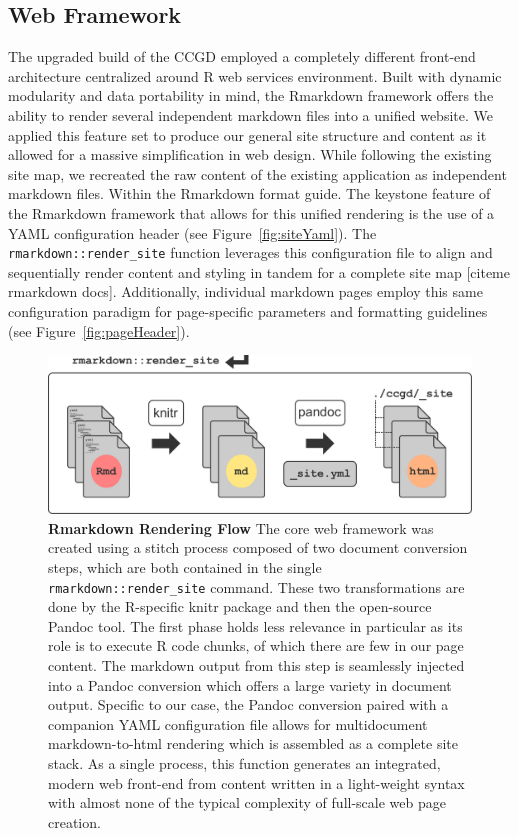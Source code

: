 \documentclass[10pt]{report}
\begin{document}
\subsection{Web Framework}
The upgraded build of the CCGD employed a completely different front-end architecture centralized around R web services environment. Built with dynamic modularity and data portability in mind, the Rmarkdown framework offers the ability to render several independent markdown files into a unified website. We applied this feature set to produce our general site structure and content as it allowed for a massive simplification in web design. While following the existing site map, we recreated the raw content of the existing application as independent markdown files. Within the Rmarkdown format guide. The keystone feature of the Rmarkdown framework that allows for this unified rendering is the use of a YAML configuration header (see Figure~\ref{fig:siteYaml}). The \texttt{rmarkdown::render\_site} function leverages this configuration file to align and sequentially render content and styling in tandem for a complete site map [citeme rmarkdown docs]. Additionally, individual markdown pages employ this same configuration paradigm for page-specific parameters and formatting guidelines (see Figure~\ref{fig:pageHeader}).

\begin{figure}[H]
    \includegraphics[width=\linewidth]{fig/rmarkdown_flow.pdf}
    \caption[Rmarkdown Rendering Flow]{\textbf{Rmarkdown Rendering Flow} The core web framework was created using a stitch process composed of two document conversion steps, which are both contained in the single \texttt{rmarkdown::render\_site} command. These two transformations are done by the R-specific knitr package and then the open-source Pandoc tool. The first phase holds less relevance in particular as its role is to execute R code chunks, of which there are few in our page content. The markdown output from this step is seamlessly injected into a Pandoc conversion which offers a large variety in document output. Specific to our case, the Pandoc conversion paired with a companion YAML configuration file allows for multidocument markdown-to-html rendering which is assembled as a complete site stack. As a single process, this function generates an integrated, modern web front-end from content written in a light-weight syntax with almost none of the typical complexity of full-scale web page creation.}\label{fig:renderFlow}
\end{figure}
\end{document}
